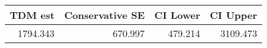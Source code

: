 \begin{tabular}{rrrr}
  \hline
TDM est & Conservative SE & CI Lower & CI Upper \\ 
  \hline
1794.343 & 670.997 & 479.214 & 3109.473 \\ 
   \hline
\end{tabular}
